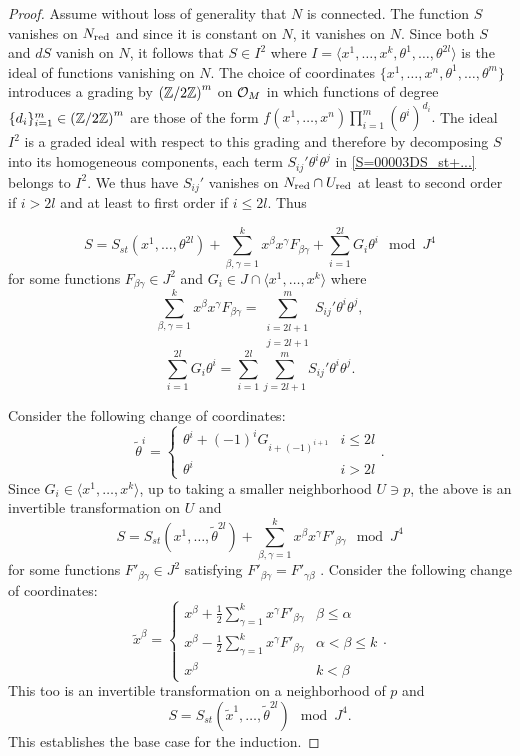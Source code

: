 \documentclass[11pt]{amsart}
\numberwithin{equation}{section}
\numberwithin{figure}{section}
\theoremstyle{plain}
\theoremstyle{definition}
\theoremstyle{remark}
\begin{document}
\begin{proof}
Assume without loss of generality that $N$ is connected. The function
$S$ vanishes on $N_{\mathrm{red}}$ and since it is constant on $N$, it
vanishes on $N$. Since both $S$ and $dS$ vanish on $N$, it follows
that $S\in I^{2}$ where $I=\langle x^{1},\dots,x^{k},\theta^{1},\dots,\theta^{2l}\rangle$
is the ideal of functions vanishing on $N$. The choice of coordinates
$\{x^{1},\dots,x^{n},\theta^{1},\dots,\theta^{m}\}$ introduces a
grading by $\left(\mathbb{Z}/2\mathbb{Z}\right)^{m}$ on $\mathcal{O}_{M}$ in which functions
of degree $\{d_{i}\}_{i=1}^{m}\in\left(\mathbb{Z}/2\mathbb{Z}\right)^{m}$ are those
of the form $f(x^{1},\dots,x^{n})\prod_{i=1}^{m}\left(\theta^{i}\right)^{d_{i}}.$
The ideal $I^{2}$ is a graded ideal with respect to this grading
and therefore by decomposing $S$ into its homogeneous components,
each term $S_{ij}'\theta^{i}\theta^{j}$ in \eqref{S=00003DS_st+...}
belongs to $I^{2}$. We thus have $S_{ij}'$ vanishes on $N_{\mathrm{red}}\cap U_{\mathrm{red}}$
at least to second order if $i>2l$ and at least to first order if
$i\leq2l$. Thus

\[
S=S_{st}(x^{1},\dots,\theta^{2l})+\sum_{\beta,\gamma=1}^{k}x^{\beta}x^{\gamma}F_{\beta\gamma}+\sum_{i=1}^{2l}G_{i}\theta^{i}\mod J^{4}
\]
for some functions $F_{\beta\gamma}\in J^{2}$ and $G_{i}\in J\cap\langle x^{1},\dots,x^{k}\rangle$
where 
\[
\sum_{\beta,\gamma=1}^{k}x^{\beta}x^{\gamma}F_{\beta\gamma}=\sum_{\substack{i=2l+1\\
j=2l+1
}
}^{m}S_{ij}'\theta^{i}\theta^{j},
\]
\[
\sum_{i=1}^{2l}G_{i}\theta^{i}=\sum_{i=1}^{2l}\sum_{j=2l+1}^{m}S_{ij}'\theta^{i}\theta^{j}.
\]


Consider the following change of coordinates:
\[
\tilde{\theta}^{i}=\begin{cases}
\theta^{i}+(-1)^{i}G_{i+(-1)^{i+1}} & i\leq2l\\
\theta^{i} & i>2l
\end{cases}.
\]
Since $G_{i}\in\langle x^{1},\dots,x^{k}\rangle$, up to taking a
smaller neighborhood $U\ni p$, the above is an invertible transformation
on $U$ and 
\[
S=S_{st}(x^{1},\dots,\tilde{\theta}^{2l})+\sum_{\beta,\gamma=1}^{k}x^{\beta}x^{\gamma}F'_{\beta\gamma}\mod J^{4}
\]
for some functions $F'_{\beta\gamma}\in J^{2}$ satisfying $F'_{\beta\gamma}=F'_{\gamma\beta}$
. Consider the following change of coordinates: 
\[
\tilde{x}^{\beta}=\begin{cases}
x^{\beta}+\frac{1}{2}\sum_{\gamma=1}^{k}x^{\gamma}F'_{\beta\gamma} & \beta\leq\alpha\\
x^{\beta}-\frac{1}{2}\sum_{\gamma=1}^{k}x^{\gamma}F'_{\beta\gamma} & \alpha<\beta\leq k\\
x^{\beta} & k<\beta
\end{cases}.
\]
This too is an invertible transformation on a neighborhood of $p$
and 
\[
S=S_{st}(\tilde{x}^{1},\dots,\tilde{\theta}^{2l})\mod J^{4}.
\]
This establishes the base case for the induction.


\end{proof}
\end{document}
